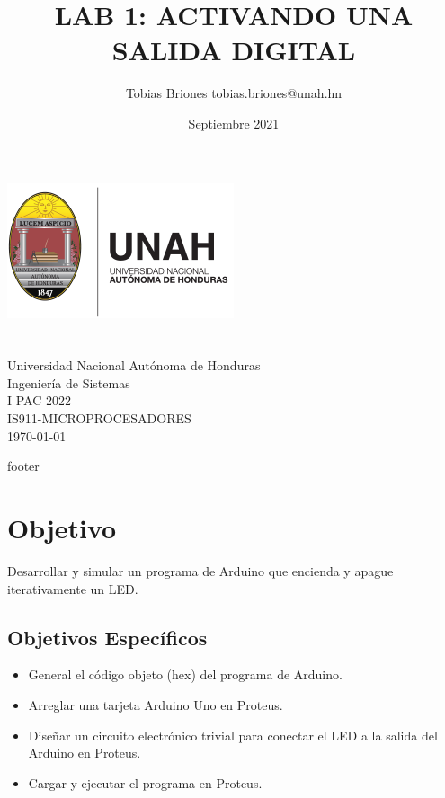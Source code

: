 \documentclass{article}
\title{LAB 1: ACTIVANDO UNA SALIDA DIGITAL}
\author{Tobias Briones \bigbreak tobias.briones@unah.hn}
\date{Septiembre 2021}
\begin{document}
    \makeatletter
    \begin{titlepage}
        \begin{center}
            \includegraphics[width=0.3\linewidth]{images/logo-unah}\\[4ex]
            {\huge \bfseries \@title
            \vspace{1cm}}\\[2ex]
            {\LARGE \@author}\\[50ex]

            {\large
            Universidad Nacional Autónoma de Honduras\\
            Ingeniería de Sistemas\\
            I PAC 2022\\
            IS911-MICROPROCESADORES
            }\\[2ex]

            {\large \today}
        \end{center}
    \end{titlepage}
    \makeatother
    \thispagestyle{empty}
    \newpage

    {footer}

    \section{Objetivo}

    Desarrollar y simular un programa de Arduino que encienda y apague
    iterativamente un LED.

    \subsection{Objetivos Específicos}

    \begin{itemize}
        \item General el código objeto (hex) del programa de Arduino.
        \item Arreglar una tarjeta Arduino Uno en Proteus.
        \item Diseñar un circuito electrónico trivial para conectar el LED a
        la salida del Arduino en Proteus.
        \item Cargar y ejecutar el programa en Proteus.
    \end{itemize}
\end{document}
